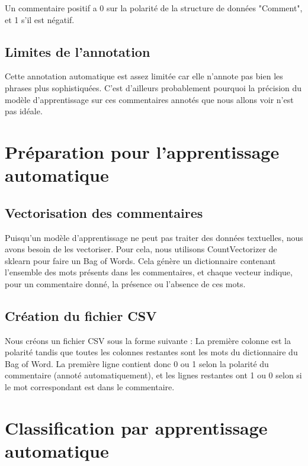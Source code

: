 \documentclass[a4paper, 12pt, openany]{book}
\begin{document}
Un commentaire positif a 0 sur la polarité de la structure de données "Comment", et 1 s'il est négatif.

\section*{Limites de l'annotation}
Cette annotation automatique est assez limitée car elle n'annote pas bien les phrases plus sophistiquées. C'est d'ailleurs probablement pourquoi la précision du modèle d'apprentissage sur ces commentaires annotés que nous allons voir n'est pas idéale.

\chapter*{Préparation pour l'apprentissage automatique}
\section*{Vectorisation des commentaires}

Puisqu'un modèle d'apprentissage ne peut pas traiter des données textuelles, nous avons besoin de les vectoriser. Pour cela, nous utilisons CountVectorizer de sklearn pour faire un Bag of Words. Cela génère un dictionnaire contenant l’ensemble des mots présents dans les commentaires, et chaque vecteur indique, pour un commentaire donné, la présence ou l’absence de ces mots.

\section*{Création du fichier CSV}

Nous créons un fichier CSV sous la forme suivante : La première colonne est la polarité tandis que toutes les colonnes restantes sont les mots du dictionnaire du Bag of Word. La première ligne contient donc 0 ou 1 selon la polarité du commentaire (annoté automatiquement), et les lignes restantes ont 1 ou 0 selon si le mot correspondant est dans le commentaire.

\chapter*{Classification par apprentissage automatique}
\end{document}

